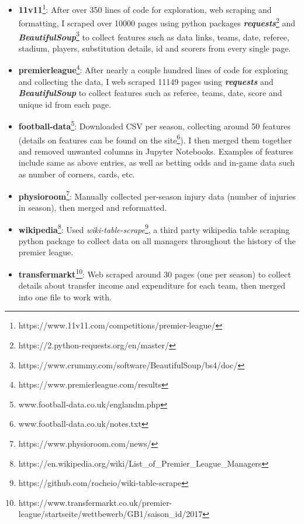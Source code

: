 \documentclass[12pt,a4paper,twoside,openright]{report}
\begin{document}
\begin{itemize}
    \item
    {
    \textbf{11v11}\footnote{https://www.11v11.com/competitions/premier-league/}: After over 350 lines of code for exploration, web scraping and formatting, I scraped over 10000 pages using python packages \textit{\textbf{requests}}\footnote{https://2.python-requests.org/en/master/} and \textit{\textbf{BeautifulSoup}}\footnote{https://www.crummy.com/software/BeautifulSoup/bs4/doc/} to collect features such as data links, teams, date, referee, stadium, players, substitution details, id and scorers from every single page.
    }
    \item 
    {
    \textbf{premierleague}\footnote{https://www.premierleague.com/results}: After nearly a couple hundred lines of code for exploring and collecting the data, I web scraped 11149 pages using \textit{\textbf{requests}} and \textit{\textbf{BeautifulSoup}} to collect features such as referee, teams, date, score and unique id from each page.
    }
    \item 
    {
    \textbf{football-data}\footnote{www.football-data.co.uk/englandm.php}: Downloaded CSV per season, collecting around 50 features (details on features can be found on the site\footnote{www.football-data.co.uk/notes.txt}). I then merged them together and removed unwanted columns in Jupyter Notebooks. Examples of features include same as above entries, as well as betting odds and in-game data such as number of corners, cards, etc.
    }
    \item
    {
    \textbf{physioroom}\footnote{https://www.physioroom.com/news/}: Manually collected per-season injury data (number of injuries in season), then merged and reformatted.
    }
    \item
    {
    \textbf{wikipedia}\footnote{https://en.wikipedia.org/wiki/List\_of\_Premier\_League\_Managers}: Used \textit{wiki-table-scrape}\footnote{https://github.com/rocheio/wiki-table-scrape}, a third party wikipedia table scraping python package to collect data on all managers throughout the history of the premier league.
    }
    \item
    {
    \textbf{transfermarkt}\footnote{https://www.transfermarkt.co.uk/premier-league/startseite/wettbewerb/GB1/saison\_id/2017}: Web scraped around 30 pages (one per season) to collect details about transfer income and expenditure for each team, then merged into one file to work with.
    }
\end{itemize}
\end{document}
